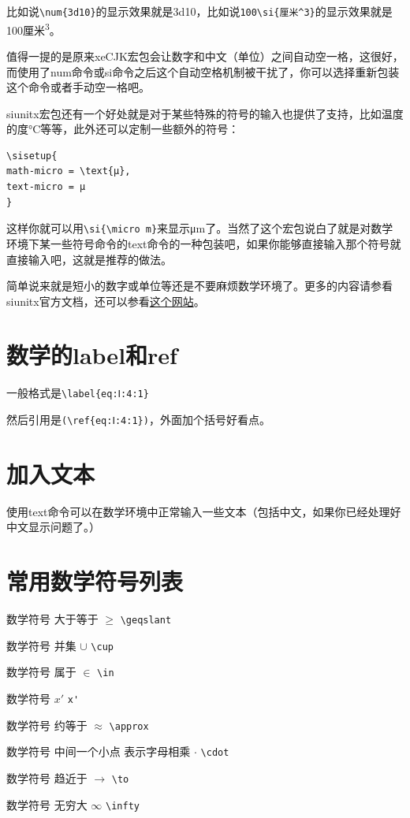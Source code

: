\documentclass[12pt,oneside]{book}
\begin{document}
\begin{common-format}
比如说\verb+\num{3d10}+的显示效果就是\num{3d10}，比如说\verb+100\si{厘米^3}+的显示效果就是100\si{厘米^3}。

值得一提的是原来xeCJK宏包会让数字和中文（单位）之间自动空一格，这很好，而使用了num命令或si命令之后这个自动空格机制被干扰了，你可以选择重新包装这个命令或者手动空一格吧。

siunitx宏包还有一个好处就是对于某些特殊的符号的输入也提供了支持，比如温度的度\si{\degreeCelsius}等等，此外还可以定制一些额外的符号：
\begin{Verbatim}
\sisetup{
math-micro = \text{μ},
text-micro = μ
}
\end{Verbatim}
这样你就可以用\verb+\si{\micro m}+来显示\si{\micro m}了。当然了这个宏包说白了就是对数学环境下某一些符号命令的text命令的一种包装吧，如果你能够直接输入那个符号就直接输入吧，这就是推荐的做法。

简单说来就是短小的数字或单位等还是不要麻烦数学环境了。更多的内容请参看siunitx官方文档，还可以参看\href{http://tex.stackexchange.com/questions/37168/when-to-use-math-mode}{这个网站}。



\section{数学的label和ref}
一般格式是\verb+\label{eq:Ⅰ:4:1}+

然后引用是\verb+(\ref{eq:Ⅰ:4:1})+，外面加个括号好看点。


\section{加入文本}
使用text命令可以在数学环境中正常输入一些文本（包括中文，如果你已经处理好中文显示问题了。）


\section{常用数学符号列表}
数学符号 大于等于 $\geqslant$  \verb+\geqslant+

数学符号 并集 $\cup$  \verb+\cup+

数学符号 属于  $\in$  \verb+\in+

数学符号 $x'$  \verb+x'+

数学符号 约等于  $\approx$ \verb+\approx+

数学符号 中间一个小点 表示字母相乘 $\cdot$  \verb+\cdot+

数学符号 趋近于  $\to$ \verb+\to+

数学符号 无穷大 $\infty$  \verb+\infty+


\end{common-format}
\end{document}
